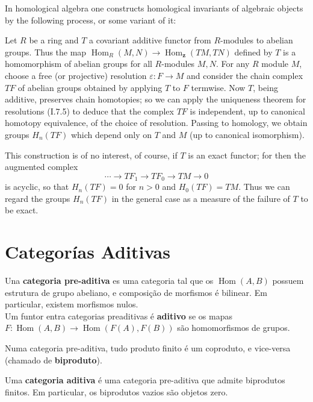 In homological algebra one constructs homological invariants of algebraic objects by the following process, or some variant of it:

Let $R$ be a ring and $T$ a covariant additive functor from $R$-modules to abelian groups. Thus the map $\operatorname{Hom}_R(M, N) \rightarrow \operatorname{Hom}_{\mathbf{z}}(T M, T N)$ defined by $T$ is a homomorphism of abelian groups for all $R$-modules $M, N$. For any $R$ module $M$, choose a free (or projective) resolution $\varepsilon: F \rightarrow M$ and consider the chain complex $T F$ of abelian groups obtained by applying $T$ to $F$ termwise. Now $T$, being additive, preserves chain homotopies; so we can apply the uniqueness theorem for resolutions (I.7.5) to deduce that the complex $T F$ is independent, up to canonical homotopy equivalence, of the choice of resolution. Passing to homology, we obtain groups $H_n(T F)$ which depend only on $T$ and $M$ (up to canonical isomorphism).

This construction is of no interest, of course, if $T$ is an exact functor; for then the augmented complex
$$
\cdots \rightarrow T F_1 \rightarrow T F_0 \rightarrow T M \rightarrow 0
$$
is acyclic, so that $H_n(T F)=0$ for $n>0$ and $H_0(T F)=T M$. Thus we can regard the groups $H_n(T F)$ in the general case as a measure of the failure of $T$ to be exact.




\chapter{Categorías Aditivas}


Una \textbf{categoria pre-aditiva} es uma categoria tal que os $\operatorname{Hom}(A,B)$ possuem estrutura de grupo abeliano, e composição de morfismos é bilinear. Em particular, existem morfismos nulos.\\
Um funtor entra categorias preaditivas é \textbf{aditivo} se os mapas $F:\operatorname{Hom}(A,B)\rightarrow \operatorname{Hom}(F(A),F(B))$ são homomorfismos de grupos. 

\begin{prop}
	Numa categoria pre-aditiva, tudo produto finito é um coproduto, e vice-versa (chamado de \textbf{biproduto}). 
\end{prop}

Uma \textbf{categoria aditiva} é uma categoria pre-aditiva que admite biprodutos finitos. Em particular, os biprodutos vazios são objetos zero.\\

